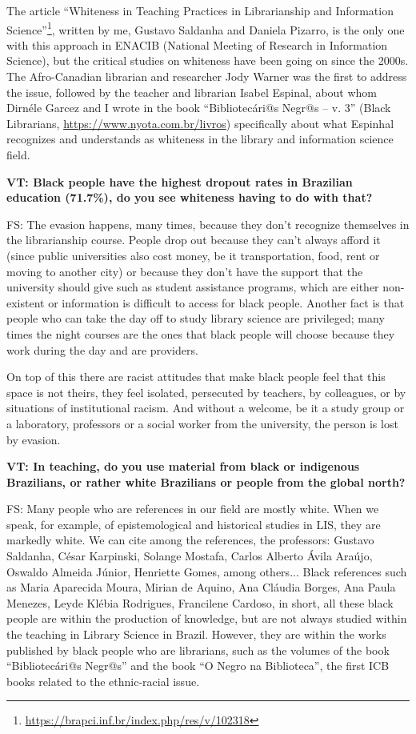 \documentclass[a4paper,
fontsize=11pt,
oneside,
numbers=noperiodatend,
parskip=half-,
bibliography=totoc,
final
]{scrartcl}
\begin{document}
The article \enquote{Whiteness in Teaching Practices in Librarianship
and Information Science}\footnote{\url{https://brapci.inf.br/index.php/res/v/102318}},
written by me, Gustavo Saldanha and Daniela Pizarro, is the only one
with this approach in ENACIB (National Meeting of Research in
Information Science), but the critical studies on whiteness have been
going on since the 2000s. The Afro-Canadian librarian and researcher
Jody Warner was the first to address the issue, followed by the teacher
and librarian Isabel Espinal, about whom Dirnéle Garcez and I wrote in
the book \enquote{Bibliotecári@s Negr@s -- v. 3} (Black Librarians,
\url{https://www.nyota.com.br/livros}) specifically about what Espinhal
recognizes and understands as whiteness in the library and information
science field.

\textbf{VT: Black people have the highest dropout rates in Brazilian
education (71.7\%), do you see whiteness having to do with that?}

FS: The evasion happens, many times, because they don't recognize
themselves in the librarianship course. People drop out because they
can't always afford it (since public universities also cost money, be it
transportation, food, rent or moving to another city) or because they
don't have the support that the university should give such as student
assistance programs, which are either non-existent or information is
difficult to access for black people. Another fact is that people who
can take the day off to study library science are privileged; many times
the night courses are the ones that black people will choose because
they work during the day and are providers.

On top of this there are racist attitudes that make black people feel
that this space is not theirs, they feel isolated, persecuted by
teachers, by colleagues, or by situations of institutional racism. And
without a welcome, be it a study group or a laboratory, professors or a
social worker from the university, the person is lost by evasion.

\textbf{VT: In teaching, do you use material from black or indigenous
Brazilians, or rather white Brazilians or people from the global north?}

FS: Many people who are references in our field are mostly white. When
we speak, for example, of epistemological and historical studies in LIS,
they are markedly white. We can cite among the references, the
professors: Gustavo Saldanha, César Karpinski, Solange Mostafa, Carlos
Alberto Ávila Araújo, Oswaldo Almeida Júnior, Henriette Gomes, among
others... Black references such as Maria Aparecida Moura, Mirian de
Aquino, Ana Cláudia Borges, Ana Paula Menezes, Leyde Klébia Rodrigues,
Francilene Cardoso, in short, all these black people are within the
production of knowledge, but are not always studied within the teaching
in Library Science in Brazil. However, they are within the works
published by black people who are librarians, such as the volumes of the
book \enquote{Bibliotecári@s Negr@s} and the book \enquote{O Negro na
Biblioteca}, the first ICB books related to the ethnic-racial issue.
\end{document}
